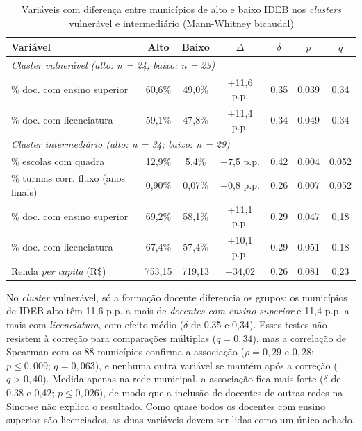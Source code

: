 \begin{table}[!ht]
\centering
\caption{Variáveis com diferença entre municípios de alto e baixo IDEB nos \textit{clusters} vulnerável e intermediário (Mann-Whitney bicaudal)}
\label{tab:mw}
\corpodez
\setlength{\tabcolsep}{3pt}
\begin{tabular}{lcccccc}
\toprule
\textbf{Variável} & \textbf{Alto} & \textbf{Baixo} & \textbf{$\Delta$} & \textbf{$\delta$} & \textbf{$p$} & \textbf{$q$} \\
\midrule
\multicolumn{7}{l}{\textit{Cluster vulnerável (alto: n = 24; baixo: n = 23)}} \\
\% doc. com ensino superior & 60,6\% & 49,0\% & +11,6 p.p. & 0,35 & 0,039 & 0,34 \\
\% doc. com licenciatura     & 59,1\% & 47,8\% & +11,4 p.p. & 0,34 & 0,049 & 0,34 \\
\midrule
\multicolumn{7}{l}{\textit{Cluster intermediário (alto: n = 34; baixo: n = 29)}} \\
\% escolas com quadra                  & 12,9\%  & 5,4\%   & +7,5 p.p.  & 0,42 & 0,004 & 0,052 \\
\% turmas corr. fluxo (anos finais) & 0,90\%  & 0,07\%  & +0,8 p.p.  & 0,26 & 0,007 & 0,052 \\
\% doc. com ensino superior            & 69,2\%  & 58,1\%  & +11,1 p.p. & 0,29 & 0,047 & 0,18 \\
\% doc. com licenciatura               & 67,4\%  & 57,4\%  & +10,1 p.p. & 0,29 & 0,051 & 0,18 \\
Renda \textit{per capita} (R\$)        & 753,15  & 719,13  & +34,02     & 0,26 & 0,081 & 0,23 \\
\bottomrule
\end{tabular}
\end{table}

No \textit{cluster} vulnerável, só a formação docente diferencia os grupos: os municípios de IDEB alto têm 11,6 p.p. a mais de \textit{docentes com ensino superior} e 11,4 p.p. a mais com \textit{licenciatura}, com efeito médio ($\delta$ de 0,35 e 0,34). Esses testes não resistem à correção para comparações múltiplas ($q = 0{,}34$), mas a correlação de Spearman com os 88 municípios confirma a associação ($\rho = 0{,}29$ e $0{,}28$; $p \leq 0{,}009$; $q = 0{,}063$), e nenhuma outra variável se mantém após a correção ($q > 0{,}40$). Medida apenas na rede municipal, a associação fica mais forte ($\delta$ de 0,38 e 0,42; $p \leq 0{,}026$), de modo que a inclusão de docentes de outras redes na Sinopse não explica o resultado. Como quase todos os docentes com ensino superior são licenciados, as duas variáveis devem ser lidas como um único achado.

